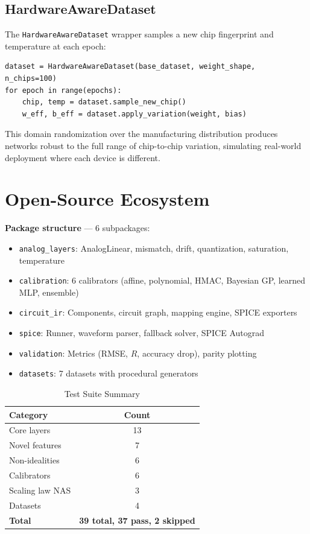 \documentclass[10pt,twocolumn]{article}
\begin{document}
\subsection{HardwareAwareDataset}

The \texttt{HardwareAwareDataset} wrapper samples a new chip fingerprint and temperature at each epoch:

\begin{verbatim}
dataset = HardwareAwareDataset(base_dataset, weight_shape, n_chips=100)
for epoch in range(epochs):
    chip, temp = dataset.sample_new_chip()
    w_eff, b_eff = dataset.apply_variation(weight, bias)
\end{verbatim}

This domain randomization over the manufacturing distribution produces networks robust to the full range of chip-to-chip variation, simulating real-world deployment where each device is different.

\section{Open-Source Ecosystem}

\textbf{Package structure} --- 6 subpackages:
\begin{itemize}
  \item \texttt{analog\_layers}: AnalogLinear, mismatch, drift, quantization, saturation, temperature
  \item \texttt{calibration}: 6 calibrators (affine, polynomial, HMAC, Bayesian GP, learned MLP, ensemble)
  \item \texttt{circuit\_ir}: Components, circuit graph, mapping engine, SPICE exporters
  \item \texttt{spice}: Runner, waveform parser, fallback solver, SPICE Autograd
  \item \texttt{validation}: Metrics (RMSE, $R$, accuracy drop), parity plotting
  \item \texttt{datasets}: 7 datasets with procedural generators
\end{itemize}

\begin{table}[t]
  \centering
  \caption{Test Suite Summary}
  \label{tab:tests}
  \begin{tabular}{lc}
    \toprule
    Category & Count \\
    \midrule
    Core layers & 13 \\
    Novel features & 7 \\
    Non-idealities & 6 \\
    Calibrators & 6 \\
    Scaling law NAS & 3 \\
    Datasets & 4 \\
    \textbf{Total} & \textbf{39 total, 37 pass, 2 skipped} \\
    \bottomrule
  \end{tabular}
\end{table}
\end{document}
